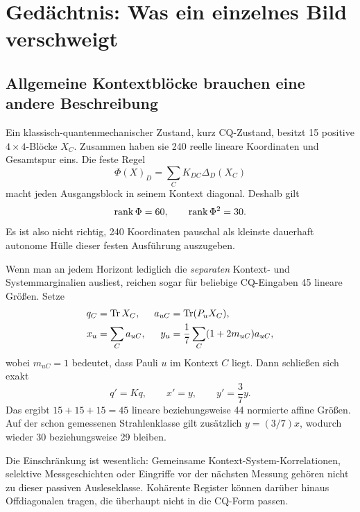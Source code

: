 \chapter{Gedächtnis: Was ein einzelnes Bild verschweigt}
\label{ch:memory}
\section{Allgemeine Kontextblöcke brauchen eine andere Beschreibung}
Ein klassisch-quantenmechanischer Zustand, kurz CQ-Zustand, besitzt 15 positive $4\times4$-Blöcke $X_C$. Zusammen haben sie 240 reelle lineare Koordinaten und Gesamtspur eins. Die feste Regel
\begin{equation}
\Phi(X)_D=\sum_CK_{DC}\Delta_D(X_C)
\end{equation}
macht jeden Ausgangsblock in seinem Kontext diagonal. Deshalb gilt
\begin{equation}
\operatorname{rank}\Phi=60,\qquad\operatorname{rank}\Phi^2=30.
\end{equation}
Es ist also nicht richtig, 240 Koordinaten pauschal als kleinste dauerhaft autonome Hülle dieser festen Ausführung auszugeben.

Wenn man an jedem Horizont lediglich die \emph{separaten} Kontext- und Systemmarginalien ausliest, reichen sogar für beliebige CQ-Eingaben 45 lineare Größen. Setze
\begin{align}
q_C&=\operatorname{Tr} X_C,&a_{uC}&=\operatorname{Tr}(P_uX_C),\\
x_u&=\sum_Ca_{uC},&y_u&=\frac17\sum_C(1+2m_{uC})a_{uC},
\end{align}
wobei $m_{uC}=1$ bedeutet, dass Pauli $u$ im Kontext $C$ liegt. Dann schließen sich exakt
\begin{equation}
q'=Kq,\qquad x'=y,\qquad y'=\frac37y.
\end{equation}
Das ergibt $15+15+15=45$ lineare beziehungsweise 44 normierte affine Größen. Auf der schon gemessenen Strahlenklasse gilt zusätzlich $y=(3/7)x$, wodurch wieder 30 beziehungsweise 29 bleiben. 

Die Einschränkung ist wesentlich: Gemeinsame Kontext-System-Korrelationen, selektive Messgeschichten oder Eingriffe vor der nächsten Messung gehören nicht zu dieser passiven Ausleseklasse. Kohärente Register können darüber hinaus Offdiagonalen tragen, die überhaupt nicht in die CQ-Form passen.

